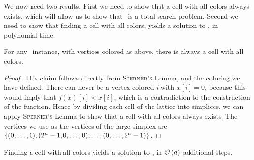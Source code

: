 We now need two results. First we need to show that a cell with all colors always exists, which will allow us to show that \Tarskistar\ is a total search problem. Second we need to show that finding a cell with all colors, yields a solution to \Tarskistar, in polynomial time.

\begin{claim}
    For any \Tarskistar\ instance, with vertices colored as above, there is always a cell with all colors.
\end{claim}
\begin{proof}
    This claim follows directly from \textsc{Sperner's} Lemma, and the coloring we have defined. There can never be a vertex colored $i$ with $x[i] = 0$, because this would imply that $f(x)[i] < x[i]$, which is a contradiction to the construction of the function. Hence by dividing each cell of the lattice into simplices, we can apply \textsc{Sperner's} Lemma to show that a cell with all colors always exists. The vertices we use as the vertices of the large simplex are $\left\{(0, \dots, 0), (2^n - 1, 0, \dots, 0), \dots, (0, \dots, 2^n - 1)\right\}$.
\end{proof}
\begin{claim}
    Finding a cell with all colors yields a solution to \Tarskistar, in $\mathcal{O}\left(d\right)$ additional steps.
\end{claim}
